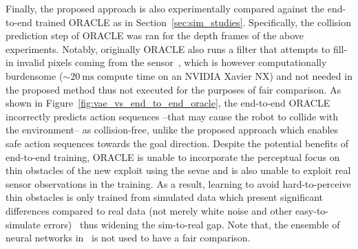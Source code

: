 Finally, the proposed approach is also experimentally compared against the end-to-end trained ORACLE as in Section~\ref{sec:sim_studies}. Specifically, the collision prediction step of ORACLE was ran for the depth frames of the above experiments. Notably, originally ORACLE also runs a filter that attempts to fill-in invalid pixels coming from the sensor~\cite{ku2018defense}, which is however computationally burdensome ($\sim20~\textrm{ms}$ compute time on an NVIDIA Xavier NX) and not needed in the proposed method thus not executed for the purposes of fair comparison. As shown in Figure~\ref{fig:vae_vs_end_to_end_oracle}, the end-to-end ORACLE incorrectly predicts action sequences --that may cause the robot to collide with the environment-- as collision-free, unlike the proposed approach which enables safe action sequences towards the goal direction. Despite the potential benefits of end-to-end training, ORACLE is unable to incorporate the perceptual focus on thin obstacles of the new exploit using the \ac{sevae} and is also unable to exploit real sensor observations in the training. As a result, learning to avoid hard-to-perceive thin obstacles is only trained from simulated data which present significant differences compared to real data (not merely white noise and other easy-to-simulate errors)~\cite{yang2018segstereo,ahn2019analysis,mallick2014characterizations} thus widening the sim-to-real gap. Note that, the ensemble of neural networks in~\cite{ORACLE_ICRA2022} is not used to have a fair comparison.  

